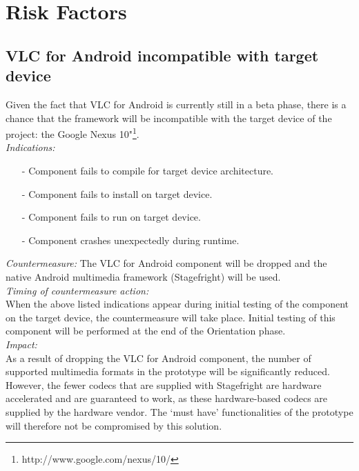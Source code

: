 \section{Risk Factors}
\subsection{VLC for Android incompatible with target device}
Given the fact that VLC for Android is currently still in a beta phase, there is a chance that the framework will be incompatible with the target device of the project: the Google Nexus 10"\footnote{http://www.google.com/nexus/10/}.\\
\newline
\textit{Indications:}
\begin{itemize}
	\item[-]Component fails to compile for target device architecture.
	\item[-]Component fails to install on target device.
	\item[-]Component fails to run on target device.
	\item[-]Component crashes unexpectedly during runtime.
	\\
\end{itemize}
\textit{Countermeasure:}
\newline
The VLC for Android component will be dropped and the native Android multimedia framework (Stagefright) will be used.\\
\newline
\textit{Timing of countermeasure action:}\\
When the above listed indications appear during initial testing of the component on the target device, the countermeasure will take place. Initial testing of this component will be performed at the end of the Orientation phase.\\
\newline
\textit{Impact:}\\
As a result of dropping the VLC for Android component, the number of supported multimedia formats in the prototype will be significantly reduced. However, the fewer codecs that are supplied with Stagefright are hardware accelerated and are guaranteed to work, as these hardware-based codecs are supplied by the hardware vendor. The `must have' functionalities of the prototype will therefore not be compromised by this solution.\\
